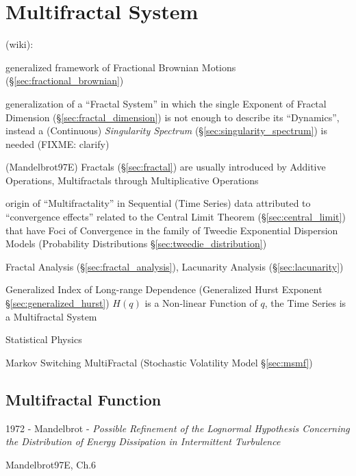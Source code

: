 \section{Multifractal System}\label{sec:multifractal_system}

(wiki):

generalized framework of Fractional Brownian Motions
(\S\ref{sec:fractional_brownian})

generalization of a ``Fractal System'' in which the single Exponent of Fractal
Dimension (\S\ref{sec:fractal_dimension}) is not enough to describe its
``Dynamics'',  instead a (Continuous) \emph{Singularity Spectrum}
(\S\ref{sec:singularity_spectrum}) is needed (FIXME: clarify)

(Mandelbrot97E) Fractals (\S\ref{sec:fractal}) are usually introduced by
Additive Operations, Multifractals through Multiplicative Operations

origin of ``Multifractality'' in Sequential (Time Series) data attributed to
``convergence effects'' related to the Central Limit Theorem
(\S\ref{sec:central_limit}) that have Foci of Convergence in the family of
Tweedie Exponential Dispersion Models (Probability Distributions
\S\ref{sec:tweedie_distribution})

Fractal Analysis (\S\ref{sec:fractal_analysis}), Lacunarity Analysis
(\S\ref{sec:lacunarity})

Generalized Index of Long-range Dependence (Generalized Hurst Exponent
\S\ref{sec:generalized_hurst}) $H(q)$ is a Non-linear Function of $q$, the Time
Series is a Multifractal System

Statistical Physics

\fist Markov Switching MultiFractal (Stochastic Volatility Model
\S\ref{sec:msmf})



\subsection{Multifractal Function}\label{sec:multifractal_function}

1972 - Mandelbrot - \emph{Possible Refinement of the Lognormal Hypothesis
  Concerning the Distribution of Energy Dissipation in Intermittent Turbulence}

Mandelbrot97E, Ch.6

